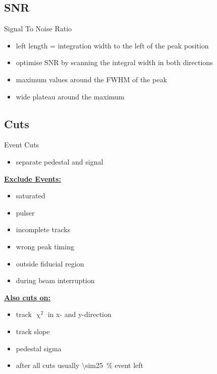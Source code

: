 \subsection{SNR}
\begin{frame}{Signal To Noise Ratio}
	
	
	\begin{itemize}\itemfill
		\item left length = integration width to the left of the peak position
		\item optimise SNR by scanning the integral width in both directions
		\item maximum values around the FWHM of the peak
		\item wide plateau around the maximum
	\end{itemize}
 
\end{frame}
\subsection{Cuts}
\begin{frame}{Event Cuts}

	\begin{itemize}
		\item separate pedestal and signal
	\end{itemize}
	
	\begin{minipage}{.4\textwidth}
		\textbf{\underline{Exclude Events:}}
		\begin{itemize}
			\item saturated
			\item pulser
			\item incomplete tracks
			\item wrong peak timing
			\item outside fiducial region
			\item during beam interruption
		\end{itemize}\vspace*{5pt}
		\textbf{\underline{Also cuts on:}}
		\begin{itemize}
		 \item track $\upchi^2$ in x- and y-direction
		 \item track slope
		 \item pedestal sigma
		\end{itemize}
	\end{minipage}
	\hfill
	\begin{minipage}{.55\textwidth}
	\end{minipage}
	
	\begin{itemize}
		\item after all cuts usually \SI{\sim25}{\%} event left
	\end{itemize}

\end{frame}
